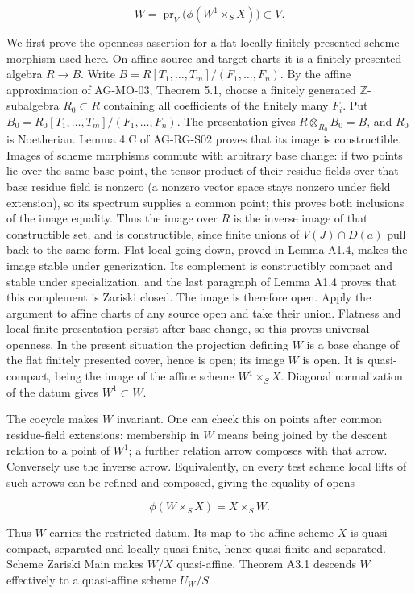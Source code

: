 \documentclass[11pt,a4paper,openany]{report}
\begin{document}
\[
W=\operatorname{pr}_V\bigl(\phi(W^1\times_S X)\bigr)\subset V.
\]

We first prove the openness assertion for a flat locally finitely presented scheme morphism used here. On affine source and target charts it is a finitely presented algebra \(R\to B\). Write \(B=R[T_1,\ldots,T_m]/(F_1,\ldots,F_n)\). By the affine approximation of AG-MO-03, Theorem 5.1, choose a finitely generated \(\mathbb Z\)-subalgebra \(R_0\subset R\) containing all coefficients of the finitely many \(F_i\). Put \(B_0=R_0[T_1,\ldots,T_m]/(F_1,\ldots,F_n)\). The presentation gives \(R\otimes_{R_0}B_0=B\), and \(R_0\) is Noetherian. Lemma 4.C of AG-RG-S02 proves that its image is constructible. Images of scheme morphisms commute with arbitrary base change: if two points lie over the same base point, the tensor product of their residue fields over that base residue field is nonzero (a nonzero vector space stays nonzero under field extension), so its spectrum supplies a common point; this proves both inclusions of the image equality. Thus the image over \(R\) is the inverse image of that constructible set, and is constructible, since finite unions of \(V(J)\cap D(a)\) pull back to the same form. Flat local going down, proved in Lemma A1.4, makes the image stable under generization. Its complement is constructibly compact and stable under specialization, and the last paragraph of Lemma A1.4 proves that this complement is Zariski closed. The image is therefore open. Apply the argument to affine charts of any source open and take their union. Flatness and local finite presentation persist after base change, so this proves universal openness. In the present situation the projection defining \(W\) is a base change of the flat finitely presented cover, hence is open; its image \(W\) is open. It is quasi-compact, being the image of the affine scheme \(W^1\times_S X\). Diagonal normalization of the datum gives \(W^1\subset W\).

The cocycle makes \(W\) invariant. One can check this on points after common residue-field extensions: membership in \(W\) means being joined by the descent relation to a point of \(W^1\); a further relation arrow composes with that arrow. Conversely use the inverse arrow. Equivalently, on every test scheme local lifts of such arrows can be refined and composed, giving the equality of opens

\[
\phi(W\times_S X)=X\times_S W.
\]

Thus \(W\) carries the restricted datum. Its map to the affine scheme \(X\) is quasi-compact, separated and locally quasi-finite, hence quasi-finite and separated. Scheme Zariski Main makes \(W/X\) quasi-affine. Theorem A3.1 descends \(W\) effectively to a quasi-affine scheme \(U_W/S\).
\end{document}
